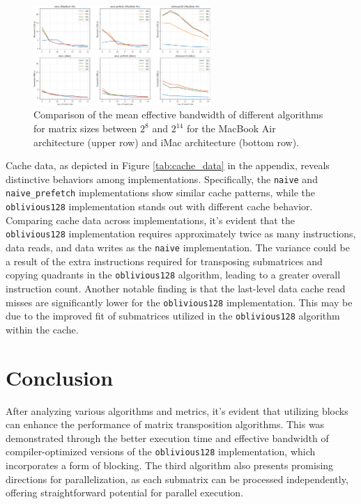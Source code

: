 \documentclass{scrartcl}
\begin{document}
    \begin{figure}
        \begin{center}
            \includegraphics[width=0.6\textwidth]{./images/bandwidth_comparision.png}
        \end{center}
        \caption{Comparison of the mean effective bandwidth of different algorithms for matrix sizes between $2^8$ and $2^{14}$ for the MacBook Air architecture (upper row) and iMac architecture (bottom row).}
        \label{fig:bandwidth_comparison}  
    \end{figure}
    Cache data, as depicted in Figure \ref{tab:cache_data} in the appendix, reveals distinctive behaviors among implementations. Specifically, the \texttt{naive} and \texttt{naive\_prefetch} implementations show similar cache patterns, while the \texttt{oblivious128} implementation stands out with different cache behavior. Comparing cache data across implementations, it's evident that the \texttt{oblivious128} implementation requires approximately twice as many instructions, data reads, and data writes as the \texttt{naive} implementation. The variance could be a result of the extra instructions required for transposing submatrices and copying quadrants in the \texttt{oblivious128} algorithm, leading to a greater overall instruction count. Another notable finding is that the last-level data cache read misses are significantly lower for the \texttt{oblivious128} implementation. This may be due to the improved fit of submatrices utilized in the \texttt{oblivious128} algorithm within the cache.

    \section{Conclusion}
    After analyzing various algorithms and metrics, it's evident that utilizing blocks can enhance the performance of matrix transposition algorithms. This was demonstrated through the better execution time and effective bandwidth of compiler-optimized versions of the \texttt{oblivious128} implementation, which incorporates a form of blocking. The third algorithm also presents promising directions for parallelization, as each submatrix can be processed independently, offering straightforward potential for parallel execution.
\end{document}
